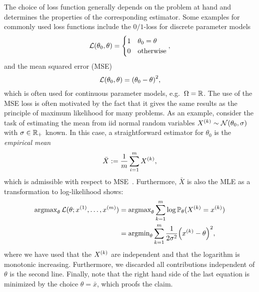The choice of loss function generally depends on the problem at hand and determines the properties of the corresponding estimator.
Some examples for commonly used loss functions include the $0/1$-loss for discrete parameter models
\[
  \mathcal{L}(\theta_0, \theta) =
  \begin{cases}
    1 & \theta_0 = \theta \\
    0 & \mathrm{otherwise}
  \end{cases},
  \label{eq:stat.frequentist.01loss}
\]
and the mean squared error (MSE)
\[
  \mathcal{L}(\theta_0, \theta) = {\left( \theta_0 - \theta \right)}^2,
  \label{eq:stat.frequentist.l2loss}
\]
which is often used for continuous parameter models, e.g.\ $\Omega = {\mathbb{R}}$.
The use of the MSE loss is often motivated by the fact that it gives the same results as the principle of maximum likelihood for many problems.
As an example, consider the task of estimating the mean from iid normal random variables $X^{(k)} \sim \mathcal{N}(\theta_0, \sigma)$ with $\sigma \in {\mathbb{R}}_+$ known.
In this case, a straightforward estimator for $\theta_0$ is the \emph{empirical mean}
\[
  \label{eq:stat.frequentist.empirical_mean}
  \bar X := \frac{1}{m} \sum_{i = 1}^m X^{(k)},
\]
which is admissible with respect to MSE~\cite[Thm.\ 12.20]{Wasserman_2013_All}.
Furthermore, $\bar X$ is also the MLE as a transformation to log-likelihood shows:
\[
  \label{eq:stat.frequentist.mle_derivation}
  \begin{split}
    \operatorname{argmax}_\theta \mathcal{L}(\theta; x^{(1)}, \ldots, x^{(m)})
    &= \operatorname{argmax}_\theta \sum_{k=1}^m \log \mathbb{P}_\theta(X^{(k)}=x^{(k)}) \\
    &= \operatorname{argmin}_\theta \sum_{k=1}^m \frac{1}{2\sigma^2} {\left( x^{(k)} - \theta \right)}^2,
  \end{split}
\]
where we have used that the $X^{(k)}$ are independent and that the logarithm is monotonic increasing.
Furthermore, we discarded all contributions independent of $\theta$ is the second line.
Finally, note that the right hand side of the last equation is minimized by the choice $\theta = \bar{x}$, which proofs the claim.


